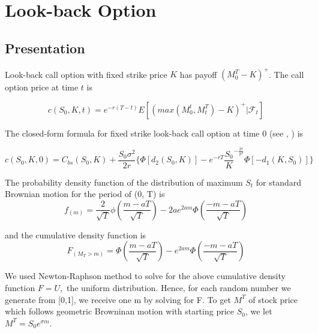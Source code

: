 \documentclass[11pt,a4paper,fleqn]{article}
\begin{document}
\section{Look-back Option}
\subsection{Presentation}
Look-back call option with fixed strike price $K$ has payoff $(M^T_{0}-K)^+$. The call option price at time $t$ is

$$c(S_0,K,t) = e^{-r(T-t)}E[(max(M^t_0,M^T_t)-K)^+|\mathcal{F}_t] $$

The closed-form formula for fixed strike look-back call option at time 0 (see \cite{lectures}, \cite{exooptions}) is

$$c(S_0,K,0)=C_{bs}(S_0,K) + \frac{S_0\sigma^2}{2r}\{ \Phi[d_2(S_0,K)]-e^{-rT}\frac{S_0}{K}^{-\frac{2r}{\sigma^2}} \Phi[-d_1(K,S_0)]\}$$


The probability density function of the distribution of maximum $S_t$ for standard Brownian motion for the period of (0, T) is
$$f_{(m)} = \frac{2}{\sqrt{T}}\phi\left(\frac{m-aT}{\sqrt{T}}\right)-2ae^{2am}\Phi\left(\frac{-m-aT}{\sqrt{T}}\right)$$

and the cumulative density function is
$$F_{(M_T>m)} = \Phi\left(\frac{m-aT}{\sqrt{T}}\right)-e^{2am}\Phi\left(\frac{-m-aT}{\sqrt{T}}\right)$$

We used Newton-Raphson method to solve for the above cumulative density function $F=U,$ the uniform distribution. Hence, for each random number we generate from [0,1], we receive one m by solving for F. To get $M^T$ of stock price which follows geometric Browninan motion with starting price $S_0$, we let $M^T=S_0e^{\sigma m }$.\\
\end{document}
